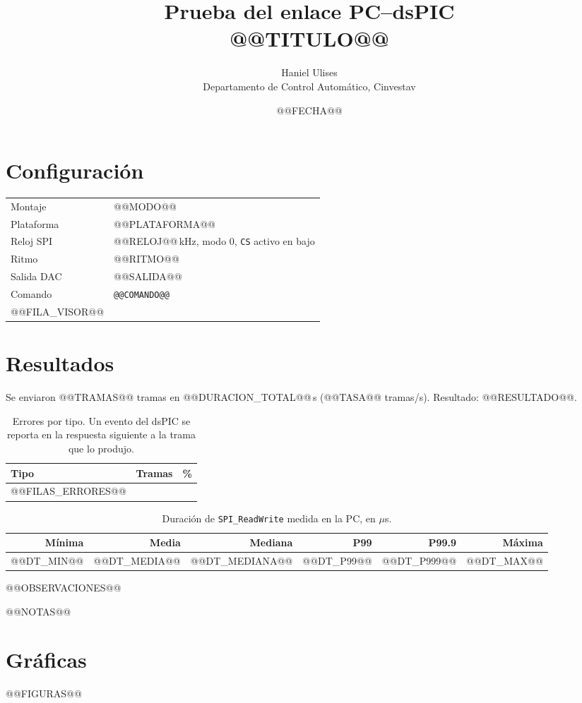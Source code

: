 \documentclass[11pt]{article}
\title{Prueba del enlace PC--dsPIC\\\large @@TITULO@@}
\author{Haniel Ulises\\Departamento de Control Automático, Cinvestav}
\date{@@FECHA@@}
\newcommand{\code}[1]{\texttt{#1}}
\begin{document}
\maketitle

\section{Configuración}

\begin{table}[H]
\centering
\begin{tabularx}{\linewidth}{@{}lX@{}}
\toprule
Montaje      & @@MODO@@ \\
Plataforma   & @@PLATAFORMA@@ \\
Reloj SPI    & @@RELOJ@@\,kHz, modo 0, \code{CS} activo en bajo \\
Ritmo        & @@RITMO@@ \\
Salida DAC   & @@SALIDA@@ \\
Comando      & \code{\small @@COMANDO@@} \\
@@FILA_VISOR@@
\bottomrule
\end{tabularx}
\end{table}

\section{Resultados}

Se enviaron @@TRAMAS@@ tramas en @@DURACION_TOTAL@@\,s (@@TASA@@ tramas/s).
Resultado: @@RESULTADO@@.

\begin{table}[H]
\centering
\caption{Errores por tipo. Un evento del dsPIC se reporta en la respuesta
siguiente a la trama que lo produjo.}
\begin{tabular}{@{}lrr@{}}
\toprule
Tipo & Tramas & \% \\
\midrule
@@FILAS_ERRORES@@
\bottomrule
\end{tabular}
\end{table}

\begin{table}[H]
\centering
\caption{Duración de \code{SPI\_ReadWrite} medida en la PC, en $\mu$s.}
\begin{tabular}{@{}rrrrrr@{}}
\toprule
Mínima & Media & Mediana & P99 & P99.9 & Máxima \\
\midrule
@@DT_MIN@@ & @@DT_MEDIA@@ & @@DT_MEDIANA@@ & @@DT_P99@@ & @@DT_P999@@ & @@DT_MAX@@ \\
\bottomrule
\end{tabular}
\end{table}

\begin{itemize}
@@OBSERVACIONES@@
\end{itemize}

@@NOTAS@@

\section{Gráficas}

@@FIGURAS@@
\end{document}

